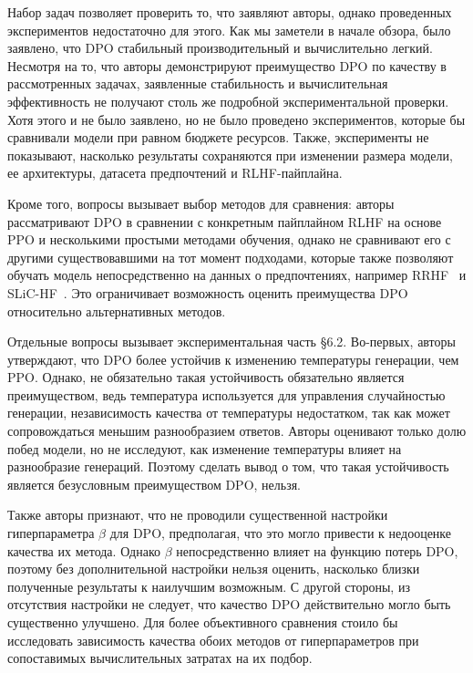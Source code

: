 \documentclass[11pt,a4paper]{article}
\theoremstyle{remark}
\begin{document}
Набор задач позволяет проверить то, что заявляют авторы, однако проведенных экспериментов недостаточно для этого. Как мы заметели в начале обзора, было заявлено, что DPO стабильный производительный и вычислительно легкий. Несмотря на то, что авторы демонстрируют преимущество DPO по качеству в рассмотренных задачах, заявленные стабильность и вычислительная эффективность не получают столь же подробной экспериментальной проверки. Хотя этого и не было заявлено, но не было проведено экспериментов, которые бы сравнивали модели при равном бюджете ресурсов. Также, эксперименты не показывают, насколько результаты сохраняются при изменении размера модели, ее архитектуры, датасета предпочтений и RLHF-пайплайна.

Кроме того, вопросы вызывает выбор методов для сравнения: авторы рассматривают DPO в сравнении с конкретным пайплайном RLHF на основе PPO и несколькими простыми методами обучения, однако не сравнивают его с другими существовавшими на тот момент подходами, которые также позволяют обучать модель непосредственно на данных о предпочтениях, например RRHF~\cite{rrhf} и SLiC-HF~\cite{slic-hf}. Это ограничивает возможность оценить преимущества DPO относительно альтернативных методов.

Отдельные вопросы вызывает экспериментальная часть \S 6.2. Во-первых, авторы утверждают, что DPO более устойчив к изменению температуры генерации, чем PPO. Однако, не обязательно такая устойчивость обязательно является преимуществом, ведь температура используется для управления случайностью генерации, независимость качества от температуры недостатком, так как может сопровождаться меньшим разнообразием ответов. Авторы оценивают только долю побед модели, но не исследуют, как изменение температуры влияет на разнообразие генераций. Поэтому сделать вывод о том, что такая устойчивость является безусловным преимуществом DPO, нельзя.

Также авторы признают, что не проводили существенной настройки гиперпараметра $\beta$ для DPO, предполагая, что это могло привести к недооценке качества их метода. Однако $\beta$ непосредственно влияет на функцию потерь DPO, поэтому без дополнительной настройки нельзя оценить, насколько близки полученные результаты к наилучшим возможным. С другой стороны, из отсутствия настройки не следует, что качество DPO действительно могло быть существенно улучшено. Для более объективного сравнения стоило бы исследовать зависимость качества обоих методов от гиперпараметров при сопоставимых вычислительных затратах на их подбор.
\end{document}
